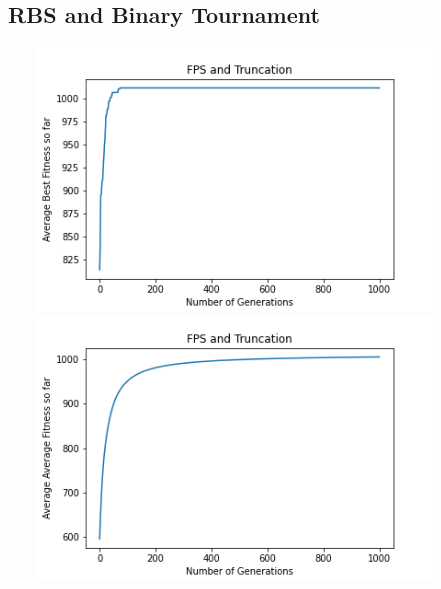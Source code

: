\documentclass[a4paper]{article}
\begin{document}
\subsection{RBS and Binary Tournament}
\includegraphics[width=12cm, height=7cm]{Graphs/KnapSack/fps_trunc_bsf.png} \\
\includegraphics[width=12cm, height=7cm]{Graphs/KnapSack/fps_trunc_avg.png} \\
\end{document}

